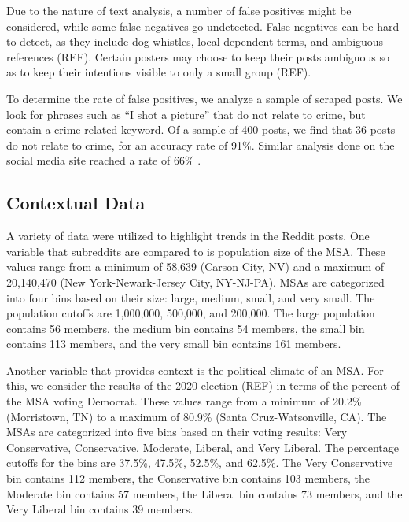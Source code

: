\documentclass[12pt,oneside, letterpaper]{book}
\begin{document}
\par Due to the nature of text analysis, a number of false positives might be considered, while some false negatives go undetected. False negatives can be hard to detect, as they include dog-whistles, local-dependent terms, and ambiguous references (REF). Certain posters may choose to keep their posts ambiguous so as to keep their intentions visible to only a small group (REF).

\par To determine the rate of false positives, we analyze a sample of scraped posts. We look for phrases such as ``I shot a picture'' that do not relate to crime, but contain a crime-related keyword. Of a sample of 400 posts, we find that 36 posts do not relate to crime, for an accuracy rate of 91\%. Similar analysis done on the social media site reached a rate of 66\% \cite{curiel}.

\subsection{Contextual Data}
\par A variety of data were utilized to highlight trends in the Reddit posts. One variable that subreddits are compared to is population size of the MSA. These values range from a minimum of 58,639 (Carson City, NV) and a maximum of 20,140,470 (New York-Newark-Jersey City, NY-NJ-PA). MSAs are categorized into four bins based on their size: large, medium, small, and very small. The population cutoffs are 1,000,000, 500,000, and 200,000. The large population contains 56 members, the medium bin contains 54 members, the small bin contains 113 members, and the very small bin contains 161 members.

\par Another variable that provides context is the political climate of an MSA. For this, we consider the results of the 2020 election (REF) in terms of the percent of the MSA voting Democrat. These values range from a minimum of 20.2\% (Morristown, TN) to a maximum of 80.9\% (Santa Cruz-Watsonville, CA). The MSAs are categorized into five bins based on their voting results: Very Conservative, Conservative, Moderate, Liberal, and Very Liberal. The percentage cutoffs for the bins are 37.5\%, 47.5\%, 52.5\%, and 62.5\%. The Very Conservative bin contains 112 members, the Conservative bin contains 103 members, the Moderate bin contains 57 members, the Liberal bin contains 73 members, and the Very Liberal bin contains 39 members.
\end{document}
